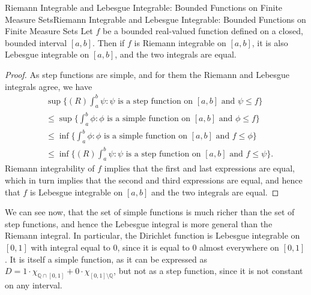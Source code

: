\documentclass[../main.tex]{subfiles}
\begin{document}
\begin{theorem}{Riemann Integrable and Lebesgue Integrable: Bounded Functions on Finite Measure Sets}{Riemann Integrable and Lebesgue Integrable: Bounded Functions on Finite Measure Sets}
	Let $f$ be a bounded real-valued function defined on a closed, bounded interval $[a, b]$. Then if $f$ is Riemann integrable on $[a, b]$, it is also Lebesgue integrable on $[a, b]$, and the two integrals are equal.
\end{theorem}
\begin{proof}
	As step functions are simple, and for them the Riemann and Lebesgue integrals agree, we have
	\begin{equation*}
		\begin{aligned}
			 & \sup \{ (R) \int_a^b \psi : \psi \text{ is a step function on } [a, b] \text{ and } \psi \leq f \}       \\
			 & \leq \sup \{ \int_a^b \phi : \phi \text{ is a simple function on } [a, b] \text{ and } \phi \leq f \}    \\
			 & \leq \inf \{ \int_a^b \phi : \phi \text{ is a simple function on } [a, b] \text{ and } f \leq \phi \}    \\
			 & \leq \inf \{ (R) \int_a^b \psi : \psi \text{ is a step function on } [a, b] \text{ and } f \leq \psi \}.
		\end{aligned}
	\end{equation*}
	Riemann integrability of $f$ implies that the first and last expressions are equal, which in turn implies that the second and third expressions are equal, and hence that $f$ is Lebesgue integrable on $[a, b]$ and the two integrals are equal.
\end{proof}

\begin{remark}
	We can see now, that the set of simple functions is much richer than the set of step functions, and hence the Lebesgue integral is more general than the Riemann integral. In particular, the Dirichlet function is Lebesgue integrable on $[0, 1]$ with integral equal to $0$, since it is equal to $0$ almost everywhere on $[0, 1]$. It is itself a simple function, as it can be expressed as $D = 1 \cdot \chi_{\mathbb{Q} \cap [0, 1]} + 0 \cdot \chi_{[0, 1] \setminus \mathbb{Q}}$, but not as a step function, since it is not constant on any interval.
\end{remark}
\end{document}

